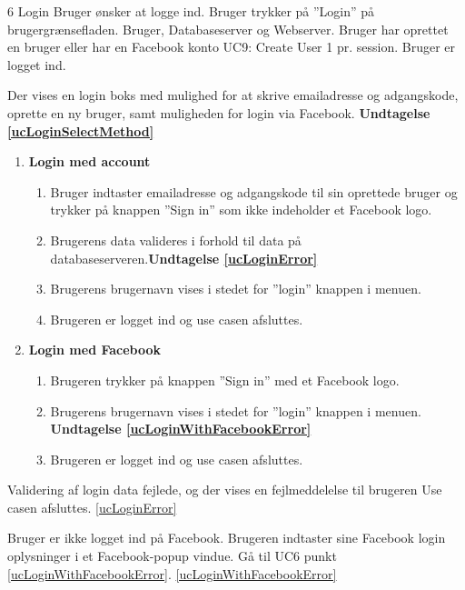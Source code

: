 
\uchead
	{6}
	{Login}
	{Bruger ønsker at logge ind.}
	{Bruger trykker på ''Login'' på brugergrænsefladen.}
	{Bruger, Databaseserver og Webserver.}
	{Bruger har oprettet en bruger eller har en Facebook konto}
	{UC9: Create User}
	{1 pr. session.}
	{Bruger er logget ind.}	
  
		
\item \label{ucLoginSelectMethod} Der vises en login boks med mulighed for at skrive emailadresse og adgangskode, oprette en ny bruger, samt muligheden for login via Facebook. \textbf{Undtagelse \ref{ucLoginSelectMethod}}

\begin{enumerate}

\item \textbf{Login med account}

	\begin{enumerate}
		\item Bruger indtaster emailadresse og adgangskode til sin oprettede bruger og trykker på knappen ''Sign in'' som ikke indeholder et Facebook logo.
		\item \label{ucLoginError}Brugerens data valideres i forhold til data på databaseserveren.\textbf{Undtagelse \ref{ucLoginError}}
		\item Brugerens brugernavn vises i stedet for ''login'' knappen i menuen.
		\item Brugeren er logget ind og use casen afsluttes.
	\end{enumerate}
	
\item \textbf{Login med Facebook}
	
	\begin{enumerate}
		\item Brugeren trykker på knappen ''Sign in'' med et Facebook logo.
		\item\label{ucLoginWithFacebookError} Brugerens brugernavn vises i stedet for ''login'' knappen i menuen. \textbf{Undtagelse \ref{ucLoginWithFacebookError}}
		\item Brugeren er logget ind og use casen afsluttes.
				
	\end{enumerate}
\end{enumerate}

\ucdescriptionend %
	\ucextension
	{Validering af login data fejlede, og der vises en fejlmeddelelse til brugeren }
	{Use casen afsluttes.}
	{\ref{ucLoginError}}

\ucextension
	{Bruger er ikke logget ind på Facebook. Brugeren indtaster sine Facebook login oplysninger i et Facebook-popup vindue.}
	{Gå til UC6 punkt \ref{ucLoginWithFacebookError}.}
	{\ref{ucLoginWithFacebookError}}


